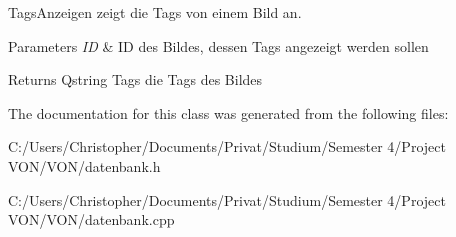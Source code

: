 Tags\+Anzeigen zeigt die Tags von einem Bild an. 


\begin{DoxyParams}{Parameters}
{\em ID} & ID des Bildes, dessen Tags angezeigt werden sollen \\
\hline
\end{DoxyParams}
\begin{DoxyReturn}{Returns}
Qstring Tags die Tags des Bildes 
\end{DoxyReturn}


The documentation for this class was generated from the following files\+:\begin{DoxyCompactItemize}
\item 
C\+:/\+Users/\+Christopher/\+Documents/\+Privat/\+Studium/\+Semester 4/\+Project V\+O\+N/\+V\+O\+N/datenbank.\+h\item 
C\+:/\+Users/\+Christopher/\+Documents/\+Privat/\+Studium/\+Semester 4/\+Project V\+O\+N/\+V\+O\+N/datenbank.\+cpp\end{DoxyCompactItemize}
